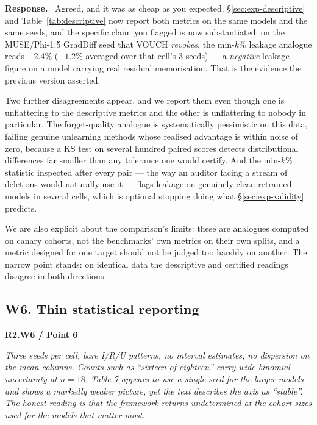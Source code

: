 \documentclass[11pt,a4paper]{article}
\newenvironment{point}[1]{%
  \par\medskip\noindent\textbf{\color{rcol}#1}\par\nopagebreak\smallskip\begingroup
  \color{rcol}\itshape}{\endgroup\par}
\newenvironment{reply}{%
  \par\smallskip\noindent\textbf{\color{acol}Response.}\ \begingroup}{\endgroup\par}
\begin{document}
\begin{reply}
Agreed, and it was as cheap as you expected. \S\ref{sec:exp-descriptive} and
Table~\ref{tab:descriptive} now report both metrics on the same models and the same seeds, and the specific
claim you flagged is now substantiated: on the MUSE/Phi-1.5 GradDiff seed that VOUCH
\emph{revokes}, the min-$k\%$ leakage analogue reads $-2.4\%$ ($-1.2\%$ averaged over that cell's $3$ seeds) --- a \emph{negative}
leakage figure on a model carrying real residual memorisation. That is the evidence the
previous version asserted.

Two further disagreements appear, and we report them even though one is unflattering to
the descriptive metrics and the other is unflattering to nobody in particular. The
forget-quality analogue is systematically pessimistic on this data, failing genuine
unlearning methods whose realised advantage is within noise of zero, because a KS test
on several hundred paired scores detects distributional differences far smaller than any
tolerance one would certify. And the min-$k\%$ statistic inspected after every pair ---
the way an auditor facing a stream of deletions would naturally use it --- flags leakage
on genuinely clean retrained models in several cells, which is optional stopping doing
what \S\ref{sec:exp-validity} predicts.

We are also explicit about the comparison's limits: these are analogues computed on
canary cohorts, not the benchmarks' own metrics on their own splits, and a metric
designed for one target should not be judged too harshly on another. The narrow point
stands: on identical data the descriptive and certified readings disagree in both
directions.
\end{reply}

\subsection*{W6. Thin statistical reporting}

\begin{point}{R2.W6 / Point 6}
Three seeds per cell, bare I/R/U patterns, no interval estimates, no dispersion on the
mean columns. Counts such as ``sixteen of eighteen'' carry wide binomial uncertainty at
$n=18$. Table 7 appears to use a single seed for the larger models and shows a markedly
weaker picture, yet the text describes the axis as ``stable''. The honest reading is
that the framework returns undetermined at the cohort sizes used for the models that
matter most.
\end{point}
\end{document}
